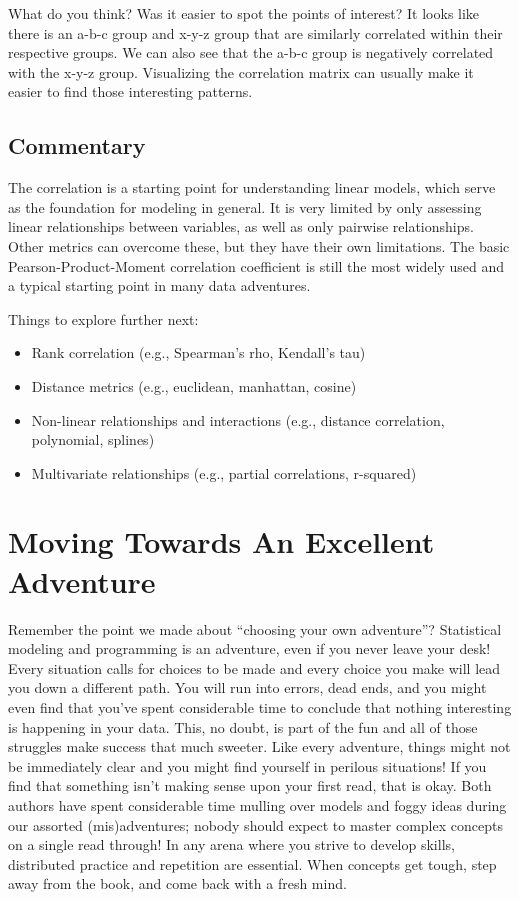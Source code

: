 \documentclass[
  letterpaper,
]{krantz}
\providecommand{\tightlist}{%
  \setlength{\itemsep}{0pt}\setlength{\parskip}{0pt}}\usepackage{longtable,booktabs,array}
\begin{document}
What do you think? Was it easier to spot the points of interest? It
looks like there is an a-b-c group and x-y-z group that are similarly
correlated within their respective groups. We can also see that the
a-b-c group is negatively correlated with the x-y-z group. Visualizing
the correlation matrix can usually make it easier to find those
interesting patterns.

\subsection{Commentary}\label{commentary}

The correlation is a starting point for understanding linear models,
which serve as the foundation for modeling in general. It is very
limited by only assessing linear relationships between variables, as
well as only pairwise relationships. Other metrics can overcome these,
but they have their own limitations. The basic Pearson-Product-Moment
correlation coefficient is still the most widely used and a typical
starting point in many data adventures.

Things to explore further next:

\begin{itemize}
\tightlist
\item
  Rank correlation (e.g., Spearman's rho, Kendall's tau)
\item
  Distance metrics (e.g., euclidean, manhattan, cosine)
\item
  Non-linear relationships and interactions (e.g., distance correlation,
  polynomial, splines)
\item
  Multivariate relationships (e.g., partial correlations, r-squared)
\end{itemize}

\section{Moving Towards An Excellent
Adventure}\label{moving-towards-an-excellent-adventure}

Remember the point we made about ``choosing your own adventure''?
Statistical modeling and programming is an adventure, even if you never
leave your desk! Every situation calls for choices to be made and every
choice you make will lead you down a different path. You will run into
errors, dead ends, and you might even find that you've spent
considerable time to conclude that nothing interesting is happening in
your data. This, no doubt, is part of the fun and all of those struggles
make success that much sweeter. Like every adventure, things might not
be immediately clear and you might find yourself in perilous situations!
If you find that something isn't making sense upon your first read, that
is okay. Both authors have spent considerable time mulling over models
and foggy ideas during our assorted (mis)adventures; nobody should
expect to master complex concepts on a single read through! In any arena
where you strive to develop skills, distributed practice and repetition
are essential. When concepts get tough, step away from the book, and
come back with a fresh mind.
\end{document}
